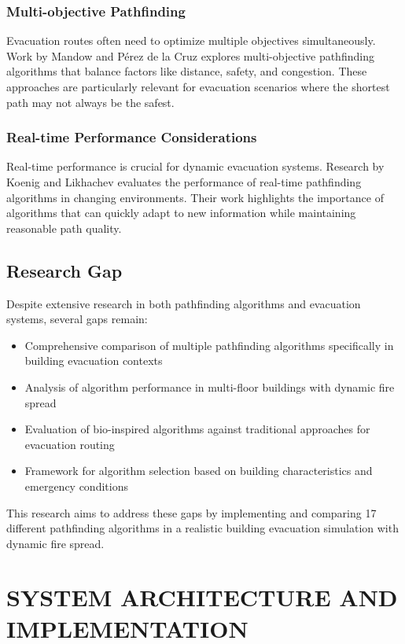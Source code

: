 \documentclass[11pt,a4paper]{report}
\begin{document}
\subsection{Multi-objective Pathfinding}
Evacuation routes often need to optimize multiple objectives simultaneously. Work by Mandow and Pérez de la Cruz \cite{mandow2010multiobjective} explores multi-objective pathfinding algorithms that balance factors like distance, safety, and congestion. These approaches are particularly relevant for evacuation scenarios where the shortest path may not always be the safest.

\subsection{Real-time Performance Considerations}
Real-time performance is crucial for dynamic evacuation systems. Research by Koenig and Likhachev \cite{koenig2006real} evaluates the performance of real-time pathfinding algorithms in changing environments. Their work highlights the importance of algorithms that can quickly adapt to new information while maintaining reasonable path quality.

\section{Research Gap}
Despite extensive research in both pathfinding algorithms and evacuation systems, several gaps remain:
\begin{itemize}
    \item Comprehensive comparison of multiple pathfinding algorithms specifically in building evacuation contexts
    \item Analysis of algorithm performance in multi-floor buildings with dynamic fire spread
    \item Evaluation of bio-inspired algorithms against traditional approaches for evacuation routing
    \item Framework for algorithm selection based on building characteristics and emergency conditions
\end{itemize}

This research aims to address these gaps by implementing and comparing 17 different pathfinding algorithms in a realistic building evacuation simulation with dynamic fire spread.

\chapter{SYSTEM ARCHITECTURE AND IMPLEMENTATION}
\end{document}
